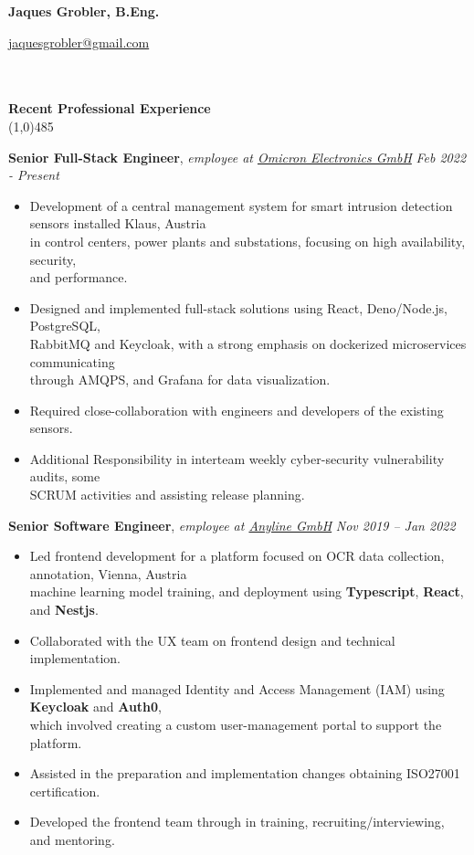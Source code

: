 \documentclass[9pt]{extarticle}
\newcommand\negativespace[1][-0.12cm]{\hspace*{#1}}
\begin{document}
\centerline{{\LARGE \bf Jaques Grobler, B.Eng.}}
\centerline{\href{mailto:jaquesgrobler@gmail.com}{jaquesgrobler@gmail.com}}


\noindent %
\\\\
\vspace*{-6pt}
{\negativespace \Large \bf Recent Professional Experience}\\
\line(1,0){485}
\\
\noindent

\noindent
{\bf Senior Full-Stack Engineer}, \textit{employee at \href{https://www.omicronenergy.com/de/}{Omicron Electronics GmbH}}  \hfill \textit{Feb 2022 - Present}
\begin{itemize}
\setlength\itemsep{0.05em}
\item Development of a central management system for smart intrusion detection sensors installed \hfill Klaus, Austria \\
in control centers, power plants and substations, focusing on high availability, security, \\
and performance.
\item Designed and implemented full-stack solutions using React, Deno/Node.js, PostgreSQL, \\
RabbitMQ and Keycloak, with a strong emphasis on dockerized microservices communicating \\
through AMQPS, and Grafana for data visualization.
\item Required close-collaboration with engineers and developers of the existing sensors.
\item Additional Responsibility in interteam weekly cyber-security vulnerability audits, some \\
 SCRUM activities and assisting release planning.
\end{itemize}

\noindent
{\bf Senior Software Engineer}, \textit{employee at \href{https://anyline.com}{Anyline GmbH}}  \hfill \textit{Nov 2019 -- Jan 2022}
\begin{itemize}
\setlength\itemsep{0.05em}

\item Led frontend development for a platform focused on OCR data collection, annotation, \hfill Vienna, Austria \\
machine learning model training, and deployment using \textbf{Typescript}, \textbf{React}, and \textbf{Nestjs}.
\item Collaborated with the UX team on frontend design and technical implementation.
\item Implemented and managed Identity and Access Management (IAM) using \textbf{Keycloak} and \textbf{Auth0}, \\
which involved creating a custom user-management portal to support the platform.
\item Assisted in the preparation and implementation changes obtaining ISO27001 certification.
\item Developed the frontend team through in training, recruiting/interviewing, and mentoring.

\end{itemize}
\end{document}
